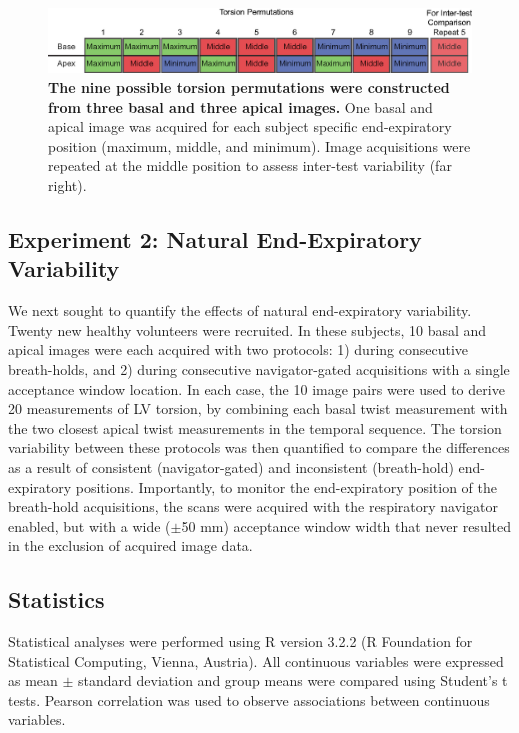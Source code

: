 	\begin{figure}
		\includegraphics{figures/torsionpaper/Fig5-TorsionPermExplanation}
		\caption[The nine possible torsion permutations were constructed from three basal and three apical images]{\textbf{The nine possible torsion permutations were constructed from three basal and three apical images.} One basal and apical image was acquired for each subject specific end-expiratory position (maximum, middle, and minimum). Image acquisitions were repeated at the middle position to assess inter-test variability (far right).}
		\label{fig:torsionpermutations}
	\end{figure}

\subsection{Experiment 2: Natural End-Expiratory Variability}
	We next sought to quantify the effects of natural end-expiratory variability. Twenty new healthy volunteers were recruited. In these subjects, 10 basal and apical images were each acquired with two protocols: 1) during consecutive breath-holds, and 2) during consecutive navigator-gated acquisitions with a single acceptance window location. In each case, the 10 image pairs were used to derive 20 measurements of LV torsion, by combining each basal twist measurement with the two closest apical twist measurements in the temporal sequence. The torsion variability between these protocols was then quantified to compare the differences as a result of consistent (navigator-gated) and inconsistent (breath-hold) end-expiratory positions. Importantly, to monitor the end-expiratory position of the breath-hold acquisitions, the scans were acquired with the respiratory navigator enabled, but with a wide ($\pm$50 mm) acceptance window width that never resulted in the exclusion of acquired image data.

\subsection{Statistics}
	Statistical analyses were performed using R version 3.2.2 (R Foundation for Statistical Computing, Vienna, Austria). All continuous variables were expressed as mean $\pm$ standard deviation and group means were compared using Student's t tests. Pearson correlation was used to observe associations between continuous variables.
	
